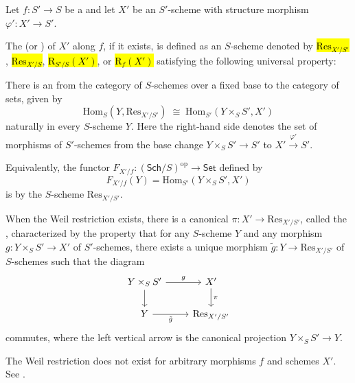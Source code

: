 \begin{definition} \label{definition:weil_restriction_on_schemes}
    Let $f : S' \to S$ be a  and let $X'$ be an $S'$-scheme with structure morphism $\varphi' : X' \to S'$.

    The  (or ) of $X'$ along $f$, if it exists, is defined as an $S$-scheme denoted by \hl{$\mathrm{Res}_{X'/S'}$}, \hl{$\mathrm{Res}_{X'/S}$}, \hl{$\mathrm{R}_{S'/S}(X')$}, or \hl{$\mathrm{R}_{f}(X')$} satisfying the following universal property:

    There is an  from the category of $S$-schemes over a fixed base to the category of sets, given by
    $$\mathrm{Hom}_{S}(Y, \mathrm{Res}_{X'/S'}) \;\cong\; \mathrm{Hom}_{S'}(Y \times_{S} S', X')$$
    naturally in every $S$-scheme $Y$. Here the right-hand side denotes the set of morphisms of $S'$-schemes from the base change $Y \times_{S} S' \to S'$ to $X' \xrightarrow{\varphi'} S'$.

    Equivalently, the functor $F_{X'/f} : (\mathsf{Sch}/S)^{\mathrm{op}} \to \mathsf{Set}$ defined by
    $$F_{X'/f}(Y) = \mathrm{Hom}_{S'}(Y \times_{S} S', X')$$
    is  by the $S$-scheme $\mathrm{Res}_{X'/S'}$.

    When the Weil restriction exists, there is a canonical  $\pi : X' \to \mathrm{Res}_{X'/S'}$, called the , characterized by the property that for any $S$-scheme $Y$ and any morphism $g : Y \times_{S} S' \to X'$ of $S'$-schemes, there exists a unique morphism $\tilde{g} : Y \to \mathrm{Res}_{X'/S'}$ of $S$-schemes such that the diagram
    $$\begin{equation*}
        \begin{tikzcd}
            Y \times_{S} S' \arrow[r, "g"] \arrow[d] & X' \arrow[d, "\pi"] \\
            Y \arrow[r, "\tilde{g}"'] & \mathrm{Res}_{X'/S'}
        \end{tikzcd}
    \end{equation*}$$
    commutes, where the left vertical arrow is the canonical projection $Y \times_{S} S' \to Y$.

    The Weil restriction does not exist for arbitrary morphisms $f$ and schemes $X'$. See .
\end{definition}

